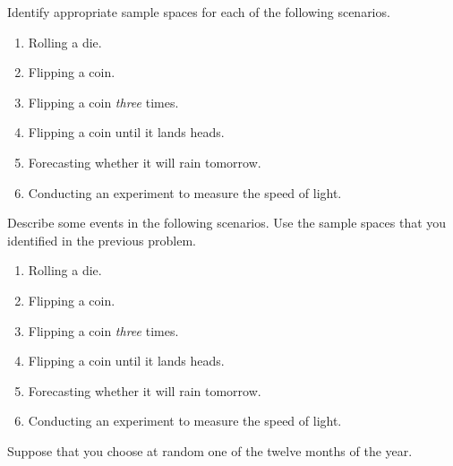 \documentclass[12pt,reqno]{amsart}
\begin{document}
\prob Identify appropriate sample spaces for each of the following scenarios.

\medskip
\begin{enumerate}
\item Rolling a die.\vfill
\item Flipping a coin.\vfill
\item Flipping a coin \textit{three} times.\vfill
\item Flipping a coin until it lands heads.\vfill
\item Forecasting whether it will rain tomorrow.\vfill
\item Conducting an experiment to measure the speed of light.\vfill
\end{enumerate}











\newpage
\prob Describe some events in the following scenarios. Use the sample spaces that you identified in the previous problem.

\medskip
\begin{enumerate}
\item Rolling a die.\vfill
\item Flipping a coin.\vfill
\item Flipping a coin \textit{three} times.\vfill
\item Flipping a coin until it lands heads.\vfill
\item Forecasting whether it will rain tomorrow.\vfill
\item Conducting an experiment to measure the speed of light.\vfill
\end{enumerate}












\prob Suppose that you choose at random one of the twelve months of the year.
\end{document}
